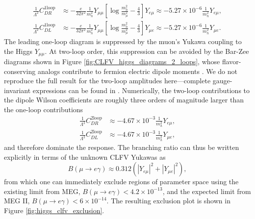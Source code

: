 \documentclass{book}[letterpaper,12pt]
\begin{document}
\begin{equation}
\begin{split}
\frac{1}{\Lambda^2}C_{DR}^{1\mathrm{loop}}&\approx-\frac{e}{32\pi^2}\frac{1}{m_h^2}Y_{\mu\mu}\left[\log\frac{m_h^2}{m_{\mu}^2}-\frac{4}{3}\right]Y_{e\mu}\approx -5.27\times 10^{-6}\frac{1}{m_h^2}Y_{e\mu},\\
\frac{1}{\Lambda^2}C_{DL}^{1\mathrm{loop}}&\approx-\frac{e}{32\pi^2}\frac{1}{m_h^2}Y_{\mu\mu}\left[\log\frac{m_h^2}{m_{\mu}^2}-\frac{4}{3}\right]Y_{\mu e}\approx -5.27\times 10^{-6}\frac{1}{m_h^2}Y_{\mu e}.
\end{split}
\end{equation}
The leading one-loop diagram is suppressed by the muon's Yukawa coupling to the Higgs $Y_{\mu\mu}$. At two-loop order, this suppression can be avoided by the Bar-Zee diagrams shown in Figure \ref{fig:CLFV_higgs_diagrams_2_loops}, whose flavor-conserving analogs contribute to fermion electric dipole moments \cite{PhysRevLett.65.21,Abe:2013qla}. We do not reproduce the full result for the two-loop amplitudes here---complete gauge-invariant expressions can be found in \cite{Cirigliano:2021img}. Numerically, the two-loop contributions to the dipole Wilson coefficients are roughly three orders of magnitude larger than the one-loop contributions
\begin{equation}
\begin{split}
\frac{1}{\Lambda^2}C_{DR}^{2\mathrm{loop}}&\approx -4.67\times 10^{-3}\frac{1}{m_h^2}Y_{e\mu},\\
\frac{1}{\Lambda^2}C_{DL}^{2\mathrm{loop}}&\approx -4.67\times 10^{-3}\frac{1}{m_h^2}Y_{\mu e},
\end{split}
\end{equation}
 and therefore dominate the response. The branching ratio can thus be written explicitly in terms of the unknown CLFV Yukawas as
\begin{equation}
B\left(\mu\rightarrow e\gamma\right)\approx 0.312\left(|Y_{e\mu}|^2+|Y_{\mu e}|^2\right),
\end{equation}
from which one can immediately exclude regions of parameter space using the existing limit from MEG, $B(\mu\rightarrow e\gamma)<4.2\times 10^{-13}$, and the expected limit from MEG II, $B(\mu\rightarrow e\gamma)<6\times 10^{-14}$. The resulting exclusion plot is shown in Figure \ref{fig:higgs_clfv_exclusion}.
\end{document}
